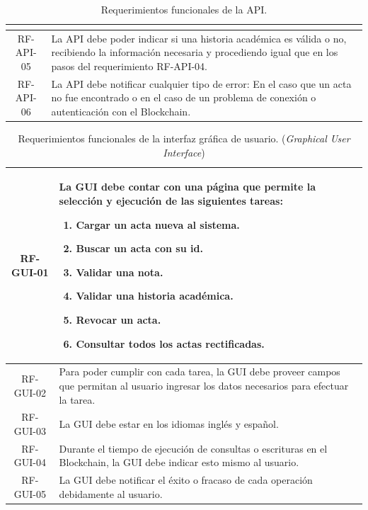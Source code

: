 \begin{table}
\begin{tabularx}{\textwidth}{|c|X|}
\begin{itemize}
    \end{itemize}\\
    \hline
    RF-API-05 & La API debe poder indicar si una historia académica es válida o no, recibiendo la información necesaria y procediendo igual que en los pasos del requerimiento RF-API-04.\\
    \hline
    RF-API-06 & La API debe notificar cualquier tipo de error: En el caso que un acta no fue encontrado o en el caso de un problema de conexión o autenticación con el Blockchain.\\
    \hline
\end{tabularx}
\caption{Requerimientos funcionales de la API.}
\label{table:req_api}
\end{table}

\begin{table}[h]
    \begin{tabularx}{\textwidth}{|c|X|}
    \hline
    RF-GUI-01 & La GUI debe contar con una página que permite la selección y ejecución de las siguientes tareas:
    \begin{enumerate}
        \item Cargar un acta nueva al sistema.
        \item Buscar un acta con su id.
        \item Validar una nota.
        \item Validar una historia académica.
        \item Revocar un acta.
        \item Consultar todos los actas rectificadas.
    \end{enumerate}\\
    \hline
    RF-GUI-02 & Para poder cumplir con cada tarea, la GUI debe proveer campos que permitan al usuario ingresar los datos necesarios para efectuar la tarea.\\
    \hline
    RF-GUI-03 & La GUI debe estar en los idiomas inglés y español. \\
    \hline
    RF-GUI-04 & Durante el tiempo de ejecución de consultas o escrituras en el Blockchain, la GUI debe indicar esto mismo al usuario.\\
    \hline
    RF-GUI-05 & La GUI debe notificar el éxito o fracaso de cada operación debidamente al usuario.\\
    \hline
    \end{tabularx}
    \caption{Requerimientos funcionales de la interfaz gráfica de usuario. (\textit{Graphical User Interface})}
    \label{table:req_gui}
\end{table}

